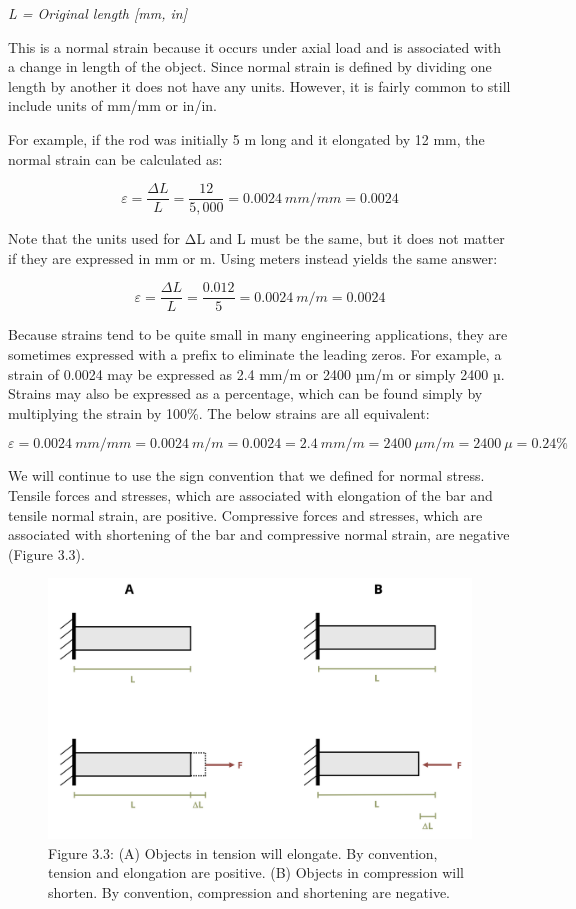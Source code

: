 \documentclass[
  letterpaper,
  DIV=11,
  numbers=noendperiod]{scrreprt}
\theoremstyle{definition}
\theoremstyle{remark}
\begin{document}
\emph{L = Original length {[}mm, in{]}}

This is a normal strain because it occurs under axial load and is
associated with a change in length of the object. Since normal strain is
defined by dividing one length by another it does not have any units.
However, it is fairly common to still include units of mm/mm or in/in.

For example, if the rod was initially 5 m long and it elongated by 12
mm, the normal strain can be calculated as:

\[
\varepsilon=\frac{\Delta L}{L}=\frac{12}{5,000}=0.0024{~mm} /{mm}=0.0024
\]

Note that the units used for ΔL and L must be the same, but it does not
matter if they are expressed in mm or m. Using meters instead yields the
same answer:

\[
\varepsilon=\frac{\Delta L}{L}=\frac{0.012}{5}=0.0024{~m}/{m}=0.0024
\]

Because strains tend to be quite small in many engineering applications,
they are sometimes expressed with a prefix to eliminate the leading
zeros. For example, a strain of 0.0024 may be expressed as 2.4 mm/m or
2400 µm/m or simply 2400 µ. Strains may also be expressed as a
percentage, which can be found simply by multiplying the strain by
100\%. The below strains are all equivalent:

\[
\varepsilon=0.0024{~mm}/{mm}=0.0024{~m}/{m}=0.0024=2.4{~mm}/{m}=2400~\mu{m}/{m}=2400 ~\mu=0.24\%
\]

We will continue to use the sign convention that we defined for normal
stress. Tensile forces and stresses, which are associated with
elongation of the bar and tensile normal strain, are positive.
Compressive forces and stresses, which are associated with shortening of
the bar and compressive normal strain, are negative (Figure 3.3).

\begin{figure}[H]

{\centering \includegraphics{images/CH3 PNGs/figure 3.3.png}

}

\caption{Figure 3.3: (A) Objects in tension will elongate. By
convention, tension and elongation are positive. (B) Objects in
compression will shorten. By convention, compression and shortening are
negative.}

\end{figure}%
\end{document}
